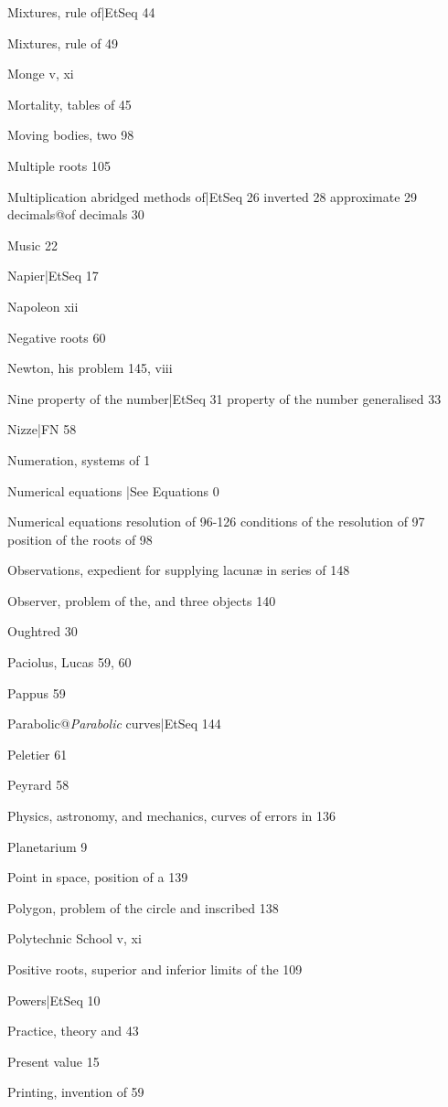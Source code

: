 \documentclass[12pt]{book}[2005/09/16]
\begin{document}
Mixtures, rule of|EtSeq 44 %

Mixtures, rule of 49

Monge v, xi

Mortality, tables of 45

Moving bodies, two 98

Multiple roots 105

Multiplication
  abridged methods of|EtSeq 26 %
  inverted 28
  approximate 29
  decimals@of decimals 30

Music 22

Napier|EtSeq 17 %

Napoleon xii

Negative roots 60

Newton, his problem 145, viii

Nine
  property of the number|EtSeq 31 %
  property of the number generalised 33

Nizze|FN 58 %

Numeration, systems of 1

Numerical equations |See Equations 0

Numerical equations
  resolution of 96-126
  conditions of the resolution of 97
  position of the roots of 98

Observations, expedient for supplying lacunæ in series of 148

Observer, problem of the, and three objects 140

Oughtred 30

Paciolus, Lucas 59, 60

Pappus 59

Parabolic@\textit{Parabolic} curves|EtSeq 144 %

Peletier 61

Peyrard 58

Physics, astronomy, and mechanics, curves of errors in 136

Planetarium 9

Point in space, position of a 139

Polygon, problem of the circle and inscribed 138

Polytechnic School v, xi

Positive roots, superior and inferior limits of the 109

Powers|EtSeq 10 %

Practice, theory and 43

Present value 15

Printing, invention of 59
\end{document}
